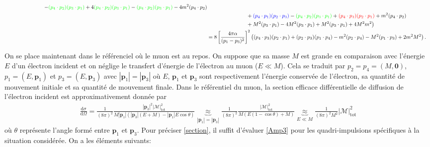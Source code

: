 {\begin{alphaparts}
\begin{align}
        \hspace{2.6cm}-\textcolor{green}{(p_{4} \cdot p_{2}) (p_{3} \cdot p_{1})}  + 4\textcolor{green}{(p_{4} \cdot p_{2})(p_{3} \cdot p_{1})}-\textcolor{green}{(p_{4} \cdot p_{2})(p_{3}\cdot p_{1})} -  4m^2 (p_{4} \cdot p_{2})\nonumber\\
        &\hspace{2.6cm}+\textcolor{blue}{(p_4 \cdot p_1) (p_2 \cdot p_3)}  -\textcolor{green}{(p_{4} \cdot p_{2}) (p_3\cdot p_{1})} + \textcolor{red}{(p_{4}\cdot p_3) (p_{2} \cdot p_{1})} + m^2 (p_{4} \cdot p_{2} )\nonumber\\ 
        &\hspace{2.6cm}+M^2 (p_{3}\cdot p_{1}) -4M^2 (p_{3} \cdot p_{1}) +M^2 (p_{3} \cdot p_{1}) +4  M^2 m^2\big)\nonumber\\
        & = 8\left[\dfrac{4 \pi \alpha}{(p_1 - p_3)^2}\right]^2 \left((p_{4} \cdot p_3) (p_{2}\cdot p_1) + (p_2 \cdot p_3)(p_1 \cdot p_4)  - m^2 (p_2 \cdot p_4) - M^2(p_1 \cdot p_3) + 2 m^2 M^2 \right).  \label{Amp3}
    \end{align} 
    \item On se place maintenant dans le référenciel où le muon est au repos. On suppose que sa masse $M$ est grande en comparaison avec l'énergie $E$ d'un électron incident et on néglige le transfert d'énergie de l'électron au muon ($E \ll M$). Cela se traduit par $p_2 = p_4 = (M, \mathbf{0})$, $p_1 = (E, \mathbf{p}_1)$ et $p_3 = (E, \mathbf{p}_3)$ avec $|\mathbf{p}_1| =  |\mathbf{p}_3|$ où $E$, $\mathbf{p}_1$ et $\mathbf{p}_3$ sont respectivement l'énergie conservée de l'électron, sa quantité de mouvement initiale et sa quantité de mouvement finale. Dans le référentiel du muon, la section efficace différentielle de diffusion de l'électron incident est approximativement donnée par 
    \begin{align}
        \frac{\mathrm{d} \sigma}{\mathrm{d} \Omega}=\frac{1}{(8 \pi)^2} \frac{|\mathbf{p}_3|^2|\mathcal{M}|_{\text{tot}}^2}{M\left|\mathbf{p}_1\right|\left(\left|\mathbf{p}_3\right|\left(E+M\right)-\left|\mathbf{p}_1\right| E \cos \theta\right)} \underbrace{\approx}_{|\mathbf{p}_1| = |\mathbf{p}_3|} \frac{1}{(8 \pi)^2} \frac{|\mathcal{M}|_{\text{tot}}^2}{M\left(E(1- \cos \theta) + M\right)} \underbrace{\approx}_{E \ll M} \frac{1}{(8 \pi)^2 M^2} |\mathcal{M}|_{\text{tot}}^2 \label{section}
    \end{align}
    où $\theta$ représente l'angle formé entre $\mathbf{p}_1$ et $\mathbf{p}_3$. 
    Pour préciser \eqref{section}, il suffit d'évaluer \eqref{Amp3} pour les quadri-impulsions spécifiques à la situation considérée. On a les éléments suivants: 

\end{alphaparts}}
